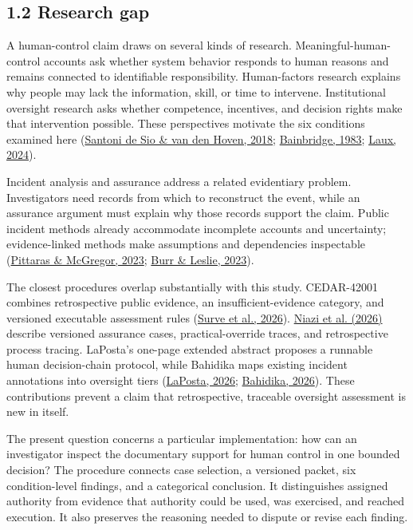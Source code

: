 \documentclass[11pt]{article}
\begin{document}
\subsection*{1.2 Research gap}

A human-control claim draws on several kinds of research. Meaningful-human-control accounts ask whether system behavior responds to human reasons and remains connected to identifiable responsibility. Human-factors research explains why people may lack the information, skill, or time to intervene. Institutional oversight research asks whether competence, incentives, and decision rights make that intervention possible. These perspectives motivate the six conditions examined here (\href{https://doi.org/10.3389/frobt.2018.00015}{Santoni de Sio \& van den Hoven, 2018}; \href{https://doi.org/10.1016/0005-1098(83)90046-8}{Bainbridge, 1983}; \href{https://doi.org/10.1007/s00146-023-01777-z}{Laux, 2024}).

Incident analysis and assurance address a related evidentiary problem. Investigators need records from which to reconstruct the event, while an assurance argument must explain why those records support the claim. Public incident methods already accommodate incomplete accounts and uncertainty; evidence-linked methods make assumptions and dependencies inspectable (\href{https://ceur-ws.org/Vol-3381/17.pdf}{Pittaras \& McGregor, 2023}; \href{https://doi.org/10.1007/s43681-022-00178-0}{Burr \& Leslie, 2023}).

The closest procedures overlap substantially with this study. CEDAR-42001 combines retrospective public evidence, an insufficient-evidence category, and versioned executable assessment rules (\href{https://doi.org/10.48550/arXiv.2606.21276}{Surve et al., 2026}). \href{https://doi.org/10.3390/automation7030096}{Niazi et al. (2026)} describe versioned assurance cases, practical-override traces, and retrospective process tracing. LaPosta's one-page extended abstract proposes a runnable human decision-chain protocol, while Bahidika maps existing incident annotations into oversight tiers (\href{https://doi.org/10.1609/aaaiss.v8i1.42543}{LaPosta, 2026}; \href{https://doi.org/10.14569/IJACSA.2026.0170502}{Bahidika, 2026}). These contributions prevent a claim that retrospective, traceable oversight assessment is new in itself.

The present question concerns a particular implementation: how can an investigator inspect the documentary support for human control in one bounded decision? The procedure connects case selection, a versioned packet, six condition-level findings, and a categorical conclusion. It distinguishes assigned authority from evidence that authority could be used, was exercised, and reached execution. It also preserves the reasoning needed to dispute or revise each finding.
\end{document}

